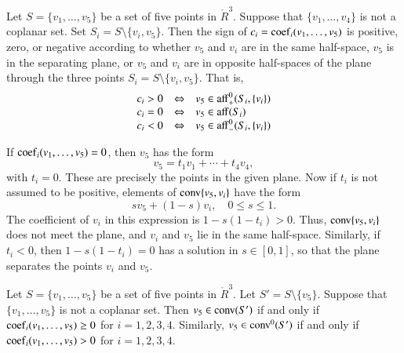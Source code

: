 \begin{tarskidata}
\begin{tarski}

\begin{lemma}
Let $S=\{v_1,\ldots,v_5\}$ be
a set of five points in $\ring{R}^3$.  Suppose
that $\{v_1,\ldots,v_4\}$ is not a coplanar
set.  Set $S_i=S\setminus \{v_i,v_5\}$. Then the sign of 
$c_i={\operatorname{coef}}_i(v_1,\ldots,v_5)$ is positive,
zero, or negative according to whether $v_5$
and $v_i$ are in the same half-space, $v_5$
is in the separating plane, or $v_5$ and $v_i$
are in opposite half-spaces of the plane
through the three points $S_i=S\setminus\{v_i,v_5\}$.
That is,
  $$
  \begin{array}{lll}
   c_i > 0 &\Leftrightarrow   &v_5\in{\operatorname{aff}}_+^0(S_i,\{v_i\})\\
   c_i = 0 &\Leftrightarrow   &v_5\in{\operatorname{aff}}(S_i)\\
   c_i < 0 &\Leftrightarrow   &v_5\in{\operatorname{aff}}_-^0(S_i,\{v_i\})\\
    \end{array}
  $$
\end{lemma}

\begin{proved}
If ${\operatorname{coef}}_i(v_1,\ldots,v_5)=0$, then $v_5$
has the form
	$$
	v_5 = t_1 v_1 + \cdots + t_4 v_4,
	$$
with $t_i=0$.  These are
precisely the points in the given plane.
Now if $t_i$ is not assumed to be positive, 
elements of
${\operatorname{conv}}\{v_5,v_i\}$ have the form
	$$s v_5 + (1-s) v_i,\quad 0\le s \le 1.$$
The coefficient of $v_i$ in this expression
is $1-s(1-t_i)>0$.  Thus, ${\operatorname{conv}}\{v_5,v_i\}$
does not meet the plane, and $v_i$ and $v_5$
lie in the same half-space.  Similarly,
if $t_i<0$, then $1-s(1-t_i)=0$ has a solution
in $s\in[0,1]$, so that the plane separates the
points $v_i$ and $v_5$.
\swallowed\end{proved}
\end{tarski}




\begin{tarski}

\begin{lemma}
Let $S=\{v_1,\ldots,v_5\}$ be
a set of five points in $\ring{R}^3$.  Let $S'=S\setminus\{v_5\}$.
Suppose
that $\{v_1,\ldots,v_5\}$ is not a coplanar
set.  Then $v_5\in{\operatorname{conv}}(S')$ if and only
if  
${\operatorname{coef}}_i(v_1,\ldots,v_5)\ge0$ 
for $i=1,2,3,4$.
Similarly, $v_5\in{\operatorname{conv}}^0(S')$ if and only
if  
${\operatorname{coef}}_i(v_1,\ldots,v_5)>0$ 
for $i=1,2,3,4$.
\end{lemma}


\end{tarski}
\end{tarskidata}
